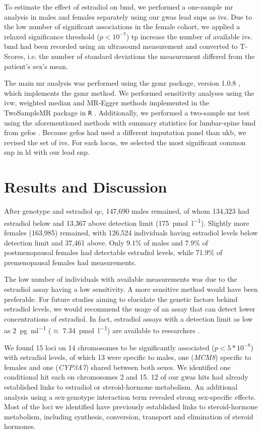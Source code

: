 \documentclass[draft]{scrbook}
\begin{document}
To estimate the effect of estradiol on \gls{bmd}, we performed a one-sample \gls{mr} analysis in males and females separately using our \gls{gwas} lead \glspl{snp} as \glspl{iv}.
Due to the low number of significant associations in the female cohort, we applied a relaxed significance threshold ($p < 10^{-7}$) tp increase the number of available \glspl{iv}.
\Gls{bmd} had been recorded using an ultrasound measurement and converted to T-Scores, i.e. the number of standard deviations the measurement differed from the patient's sex's mean. 

The main \gls{mr} analysis was performed using the \textsf{gsmr} package, version 1.0.8 \cite{Zhu2018}, which implements the \gls{gsmr} method.
We performed sensitivity analyses using the \gls{ivw}, weighted median and MR-Egger methods implemented in the \textsf{TwoSampleMR} package in \texttt{R} \cite{Hemani2018}.
Additionally, we performed a two-sample \gls{mr} test using the aforementioned methods with summary statistics for lumbar-spine \gls{bmd} from \gls{gefos} \cite{Estrada2012}.
Because \gls{gefos} had used a different imputation panel than \gls{ukb}, we revised the set of \glspl{iv}.
For each locus, we selected the most significant common \gls{snp} in \gls{ld} with our lead \gls{snp}.

\section{Results and Discussion}
\label{sec:p1discussion}
After genotype and estradiol \gls{qc}, 147,690 males remained, of whom 134,323 had estradiol below and 13,367 above detection limit (\qty{175}{\pmol\per\l}).
Slightly more females (163,985) remained, with 126,524 individuals having estradiol levels below detection limit and 37,461 above.
Only 9.1\% of males and 7.9\% of postmenopausal females had detectable estradiol levels, while 71.9\% of premenopausal females had measurements.

The low number of individuals with available measurements was due to the estradiol assay having a low sensitivity.
A more sensitive method would have been preferable.
For future studies aiming to elucidate the genetic factors behind estradiol levels, we would recommend the usage of an assay that can detect lower concentrations of estradiol.
In fact, estradiol assays with a detection limit as low as \qty{2}{\pg\per\ml} ($\approx$ \qty{7.34}{\pmol\per\l}) are available to researchers \cite{Travison2014}.

We found 15 loci on 14 chromosomes to be significantly associated ($p < 5*10^{-8}$) with estradiol levels, of which 13 were specific to males, one (\textit{MCM8}) specific to females and one (\textit{CYP3A7}) shared between both sexes.
We identified one conditional hit each on chromosomes 2 and 15.
12 of our \gls{gwas} hits had already established links to estradiol or steroid-hormone metabolism.
An additional analysis using a sex-genotype interaction term revealed strong sex-specific effects.
Most of the loci we identified have previously established links to steroid-hormone metabolism, including synthesis, conversion, transport and elimination of steroid hormones.
\end{document}
